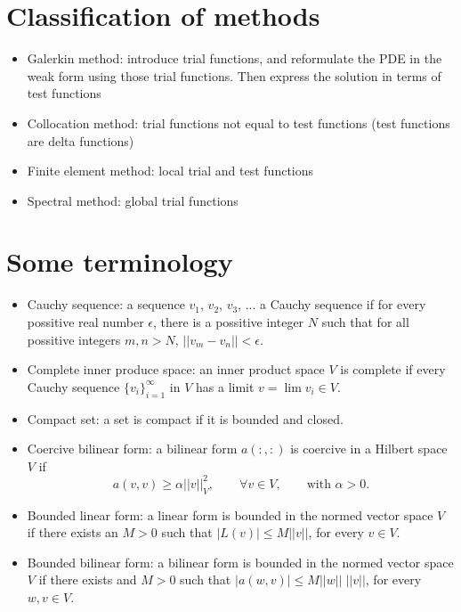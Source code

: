 \documentclass[oneside,a4paper,11pt]{report}
\begin{document}
\section{Classification of methods}
\begin{itemize}
    \item Galerkin method: introduce trial functions, and reformulate the PDE in the weak form using those trial functions. Then express the solution in terms of test functions
    \item Collocation method: trial functions not equal to test functions (test functions are delta functions)    
    \item Finite element method: local trial and test functions
    \item Spectral method: global trial functions
\end{itemize}

\section{Some terminology}
\begin{itemize}
    \item Cauchy sequence: a sequence $v_1$, $v_2$, $v_3$, ... \@is a Cauchy sequence if for every possitive real number $\epsilon$, there is a possitive integer $N$ such that for all possitive integers $m,n>N$, $||v_m-v_n||<\epsilon$. 
    \item Complete inner produce space: an inner product space $V$ is complete if every Cauchy sequence $\{v_i\}_{i=1}^\infty$ in $V$ has a limit $v = \lim v_i \in V$.
    \item Compact set: a set is compact if it is bounded and closed.
    \item Coercive bilinear form: a bilinear form $a(:,:)$ is coercive in a Hilbert space $V$ if 
    \begin{equation}
        a(v,v) \ge \alpha ||v||_V^2, \qquad \forall v \in V, \qquad \text{with }\alpha > 0.
    \end{equation}
    \item Bounded linear form: a linear form is bounded in the normed vector space $V$ if there exists an $M>0$ such that $|L(v)| \le M ||v||$, for every $v \in V$. 
    \item Bounded bilinear form: a bilinear form is bounded in the normed vector space $V$ if there exists and $M>0$ such that $|a(w,v)| \le M ||w||\;||v||$, for every $w,v \in V$.
\end{itemize}
\end{document}
